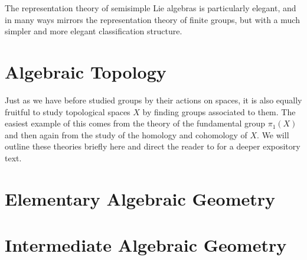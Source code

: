 		\begin{defn}[Ideal]
			
		\end{defn}
		
		\begin{defn}
			
		\end{defn}
		
		The representation theory of semisimple Lie algebras is particularly elegant, and in many ways mirrors the representation theory of finite groups, but with a much simpler and more elegant classification structure. 
	
	\section{Algebraic Topology} %
	\label{sec:algebraic_topology}
	
	Just as we have before studied groups by their actions on spaces, it is also equally fruitful to study topological spaces $X$ by finding groups associated to them. The easiest example of this comes from the theory of the fundamental group $\pi_1 (X)$ and then again from the study of the homology and cohomology of $X$. We will outline these theories briefly here and direct the reader to \cite{hatcher} for a deeper expository text.
	
	


	\section{Elementary Algebraic Geometry} %
	\label{sec:elementary_algebraic_geometry}

	
	\section{Intermediate Algebraic Geometry} %
	\label{sec:intermediate_algebraic_geometry}
	
